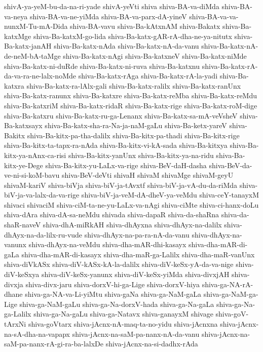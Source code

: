 {shivA-ya-yeM-bu-da-na-ri-yade
shivA-yeVti
shiva
shiva-BA-va-diMda
shiva-BA-va-neya
shiva-BA-va-ne-yiMda
shiva-BA-va-parx-dA-yineV
shiva-BA-va-va-nunxM-Tu-mA-Dida
shiva-BA-vavu
shiva-Ba-kAtxnAM
shiva-Bakatx
shiva-Ba-katxMge
shiva-Ba-katxM-go-lida
shiva-Ba-katx-gAR-rA-dha-ne-ya-nitutx
shiva-Ba-katx-janAH
shiva-Ba-katx-nAda
shiva-Ba-katx-nA-da-vanu
shiva-Ba-katx-nA-de-neM-bA-taMge
shiva-Ba-katx-nAgi
shiva-Ba-katxneV
shiva-Ba-katx-niMde
shiva-Ba-katx-ni-duRde
shiva-Ba-katx-ni-ruva
shiva-Ba-katxnu
shiva-Ba-katx-rA-da-va-ra-ne-lalx-noMde
shiva-Ba-katx-rAga
shiva-Ba-katx-rA-la-yadi
shiva-Ba-katxra
shiva-Ba-katx-ra-lAlx-gali
shiva-Ba-katx-ralilx
shiva-Ba-katx-ranUnx
shiva-Ba-katx-ranunx
shiva-Ba-katxre
shiva-Ba-katx-reMba
shiva-Ba-katx-reMdu
shiva-Ba-katxriM
shiva-Ba-katx-ridaR
shiva-Ba-katx-rige
shiva-Ba-katx-roM-dige
shiva-Ba-katxru
shiva-Ba-katx-ru-ga-Lenanx
shiva-Ba-katx-sa-mA-veVsheV
shiva-Ba-katxsayx
shiva-Ba-katx-sha-ra-Na-ja-naM-gaLu
shiva-Ba-ketx-yareV
shiva-Bakitx
shiva-Ba-kitx-pa-tha-dalilx
shiva-Ba-kitx-pa-thadi
shiva-Ba-kitx-rige
shiva-Ba-kitx-ta-tapx-ra-nAda
shiva-Ba-kitx-vi-kA-sada
shiva-Ba-kitxya
shiva-Ba-kitx-ya-nAnx-ca-risi
shiva-Ba-kitx-yanUnx
shiva-Ba-kitx-ya-na-ridu
shiva-Ba-kitx-ye-Dege
shiva-Ba-kitx-yu-LaLx-va-rige
shiva-BeV-daH-dasha
shiva-BeV-da-ve-ni-si-koM-bavu
shiva-BeV-deVti
shivaH
shivaM
shivaMge
shivaM-geyU
shivaM-kariV
shiva-biVja
shiva-biV-ja-tAvxtf
shiva-biV-ja-vA-du-da-riMda
shiva-biV-ja-va-lalx-da-va-rige
shiva-biV-ja-veM-dA-dheV-ya-veMdu
shiva-ceY-tanayxM
shivaci
shivaciM
shiva-ciM-ta-ne-yu-LaLx-va-nAgi
shiva-ciMte
shiva-ci-hanx-doLu
shiva-dAra
shiva-dA-sa-neMdu
shivada
shiva-dapaR
shiva-da-shaRna
shiva-da-shaR-naveV
shiva-dhA-miRkAH
shiva-dhAyxna
shiva-dhAyx-na-dalilx
shiva-dhAyx-na-da-lilx-ru-vude
shiva-dhAyx-na-pa-ra-nA-da-vanu
shiva-dhAyx-na-vanunx
shiva-dhAyx-na-veMdu
shiva-dha-mAR-dhi-kasayx
shiva-dha-mAR-di-gaLa
shiva-dha-mAR-di-kasayx
shiva-dha-maR-ga-Lalilx
shiva-dha-maR-vanUnx
shiva-diVkASx
shiva-diV-kASx-kA-la-dalilx
shiva-diV-keSx-yA-da-va-nige
shiva-diV-keSxya
shiva-diV-keSx-yanunx
shiva-diV-keSx-yiMda
shiva-divxjAH
shiva-divxja
shiva-divx-jaru
shiva-dorxV-hi-ga-Lige
shiva-dorxV-hiya
shiva-ga-NA-rA-dhane
shiva-ga-NA-va-Li-yiMtu
shiva-gaNa
shiva-ga-NaM-gaLa
shiva-ga-NaM-ga-Lige
shiva-ga-NaM-gaLu
shiva-ga-Na-dorxV-hada
shiva-ga-Na-gaLa
shiva-ga-Na-ga-Lalilx
shiva-ga-Na-gaLu
shiva-ga-Natavx
shiva-ganayxM
shivage
shiva-goV-tArxNi
shiva-goVtarx
shiva-jAcnx-nA-maq-ta-no-yidu
shiva-jAcnxna
shiva-jAcnx-na-sA-dha-na-vapapx
shiva-jAcnx-na-saM-pa-nanx-nA-da-vanu
shiva-jAcnx-na-saM-pa-nanx-rA-gi-ra-ba-lalxDe
shiva-jAcnx-na-si-dadhx-rAda
}
